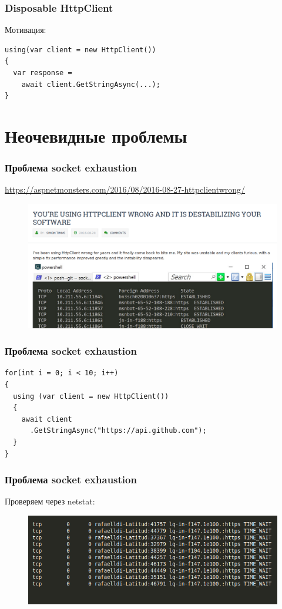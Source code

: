 \documentclass[17pt,aspectratio=169]{beamer}
\begin{document}
\begin{frame}[fragile]
\frametitle{Disposable HttpClient}
Мотивация:
\newline
\begin{lstlisting}
using(var client = new HttpClient())
{
  var response = 
    await client.GetStringAsync(...);
}
\end{lstlisting}
\end{frame}

\section{Неочевидные проблемы}
\begin{frame}
\frametitle{Проблема socket exhaustion}
\href{https://aspnetmonsters.com/2016/08/2016-08-27-httpclientwrong/}{https://aspnetmonsters.com/2016/08/2016-08-27-httpclientwrong/}
\begin{figure}
\includegraphics[scale=0.3]{aspnetmonsters}
\end{figure}
\end{frame}

\begin{frame}[fragile]
\frametitle{Проблема socket exhaustion}
\begin{lstlisting}
for(int i = 0; i < 10; i++)
{
  using (var client = new HttpClient())
  {
    await client
      .GetStringAsync("https://api.github.com");
  }
}
\end{lstlisting}
\end{frame}

\begin{frame}
\frametitle{Проблема socket exhaustion}
Проверяем через netstat:
\begin{figure}
\includegraphics[scale=0.53]{netstat}
\end{figure}
\end{frame}
\end{document}
